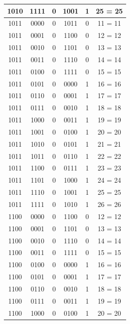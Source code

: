 \documentclass{exam}
\begin{document}
\begin{center}
\begin{longtable}{|c|c|c|c|c|c|}
                1010 & 1111 & 0 & 1001 & 1 & 25 = 25 \\ \hline
                1011 & 0000 & 0 & 1011 & 0 & 11 = 11 \\ \hline
                1011 & 0001 & 0 & 1100 & 0 & 12 = 12 \\ \hline
                1011 & 0010 & 0 & 1101 & 0 & 13 = 13 \\ \hline
                1011 & 0011 & 0 & 1110 & 0 & 14 = 14 \\ \hline
                1011 & 0100 & 0 & 1111 & 0 & 15 = 15 \\ \hline
                1011 & 0101 & 0 & 0000 & 1 & 16 = 16 \\ \hline
                1011 & 0110 & 0 & 0001 & 1 & 17 = 17 \\ \hline
                1011 & 0111 & 0 & 0010 & 1 & 18 = 18 \\ \hline
                1011 & 1000 & 0 & 0011 & 1 & 19 = 19 \\ \hline
                1011 & 1001 & 0 & 0100 & 1 & 20 = 20 \\ \hline
                1011 & 1010 & 0 & 0101 & 1 & 21 = 21 \\ \hline
                1011 & 1011 & 0 & 0110 & 1 & 22 = 22 \\ \hline
                1011 & 1100 & 0 & 0111 & 1 & 23 = 23 \\ \hline
                1011 & 1101 & 0 & 1000 & 1 & 24 = 24 \\ \hline
                1011 & 1110 & 0 & 1001 & 1 & 25 = 25 \\ \hline
                1011 & 1111 & 0 & 1010 & 1 & 26 = 26 \\ \hline
                1100 & 0000 & 0 & 1100 & 0 & 12 = 12 \\ \hline
                1100 & 0001 & 0 & 1101 & 0 & 13 = 13 \\ \hline
                1100 & 0010 & 0 & 1110 & 0 & 14 = 14 \\ \hline
                1100 & 0011 & 0 & 1111 & 0 & 15 = 15 \\ \hline
                1100 & 0100 & 0 & 0000 & 1 & 16 = 16 \\ \hline
                1100 & 0101 & 0 & 0001 & 1 & 17 = 17 \\ \hline
                1100 & 0110 & 0 & 0010 & 1 & 18 = 18 \\ \hline
                1100 & 0111 & 0 & 0011 & 1 & 19 = 19 \\ \hline
                1100 & 1000 & 0 & 0100 & 1 & 20 = 20 \\ \hline

\end{longtable}
\end{center}
\end{document}

